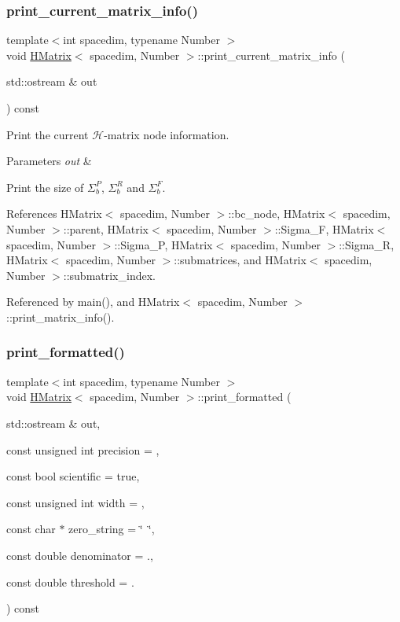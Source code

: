\subsubsection{\texorpdfstring{print\+\_\+current\+\_\+matrix\+\_\+info()}{print\_current\_matrix\_info()}}
{\footnotesize\ttfamily template$<$int spacedim, typename Number $>$ \\
void \hyperlink{classHMatrix}{H\+Matrix}$<$ spacedim, Number $>$\+::print\+\_\+current\+\_\+matrix\+\_\+info (\begin{DoxyParamCaption}\item[{std\+::ostream \&}]{out }\end{DoxyParamCaption}) const}

Print the current $\mathcal{H}$-\/matrix node information.


\begin{DoxyParams}{Parameters}
{\em out} & \\
\hline
\end{DoxyParams}
Print the size of $\Sigma_b^P$, $\Sigma_b^R$ and $\Sigma_b^F$.

References H\+Matrix$<$ spacedim, Number $>$\+::bc\+\_\+node, H\+Matrix$<$ spacedim, Number $>$\+::parent, H\+Matrix$<$ spacedim, Number $>$\+::\+Sigma\+\_\+F, H\+Matrix$<$ spacedim, Number $>$\+::\+Sigma\+\_\+P, H\+Matrix$<$ spacedim, Number $>$\+::\+Sigma\+\_\+R, H\+Matrix$<$ spacedim, Number $>$\+::submatrices, and H\+Matrix$<$ spacedim, Number $>$\+::submatrix\+\_\+index.



Referenced by main(), and H\+Matrix$<$ spacedim, Number $>$\+::print\+\_\+matrix\+\_\+info().

\mbox{\label{classHMatrix_a7e849f7e8f35e3ebdfcb2dbb7ad4ad01}} 
\subsubsection{\texorpdfstring{print\+\_\+formatted()}{print\_formatted()}}
{\footnotesize\ttfamily template$<$int spacedim, typename Number $>$ \\
void \hyperlink{classHMatrix}{H\+Matrix}$<$ spacedim, Number $>$\+::print\+\_\+formatted (\begin{DoxyParamCaption}\item[{std\+::ostream \&}]{out,  }\item[{const unsigned int}]{precision = {},  }\item[{const bool}]{scientific = {\ttfamily true},  }\item[{const unsigned int}]{width = {},  }\item[{const char $\ast$}]{zero\+\_\+string = {\ttfamily \char`\"{}~\char`\"{}},  }\item[{const double}]{denominator = {.},  }\item[{const double}]{threshold = {.} }\end{DoxyParamCaption}) const}

